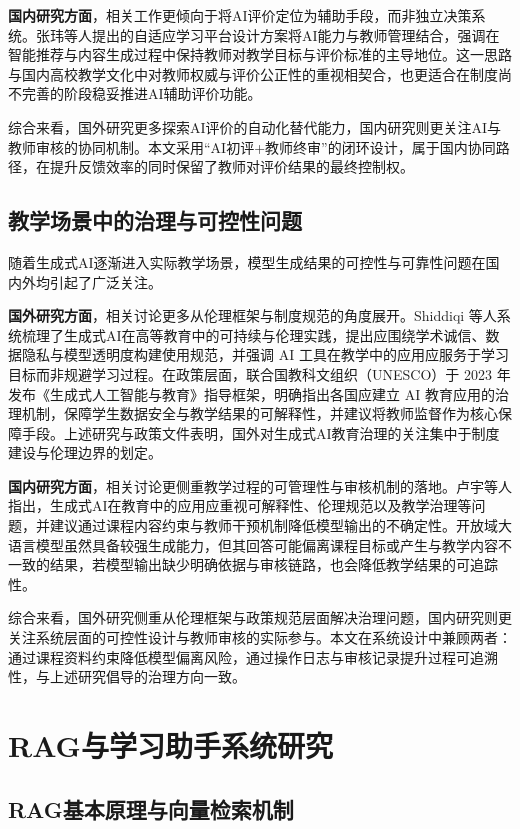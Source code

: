 \documentclass[12pt,a4paper,oneside]{ctexbook}
\numberwithin{equation}{chapter}
\begin{document}
\textbf{国内研究方面}，相关工作更倾向于将AI评价定位为辅助手段，而非独立决策系统。张玮等人提出的自适应学习平台设计方案将AI能力与教师管理结合，强调在智能推荐与内容生成过程中保持教师对教学目标与评价标准的主导地位\cite{ref4}。这一思路与国内高校教学文化中对教师权威与评价公正性的重视相契合，也更适合在制度尚不完善的阶段稳妥推进AI辅助评价功能。

综合来看，国外研究更多探索AI评价的自动化替代能力，国内研究则更关注AI与教师审核的协同机制。本文采用“AI初评+教师终审”的闭环设计，属于国内协同路径，在提升反馈效率的同时保留了教师对评价结果的最终控制权。

\subsection{教学场景中的治理与可控性问题}

随着生成式AI逐渐进入实际教学场景，模型生成结果的可控性与可靠性问题在国内外均引起了广泛关注。

\textbf{国外研究方面}，相关讨论更多从伦理框架与制度规范的角度展开。Shiddiqi 等人系统梳理了生成式AI在高等教育中的可持续与伦理实践，提出应围绕学术诚信、数据隐私与模型透明度构建使用规范，并强调 AI 工具在教学中的应用应服务于学习目标而非规避学习过程\cite{ref2}。在政策层面，联合国教科文组织（UNESCO）于 2023 年发布《生成式人工智能与教育》指导框架，明确指出各国应建立 AI 教育应用的治理机制，保障学生数据安全与教学结果的可解释性，并建议将教师监督作为核心保障手段\cite{ref16}。上述研究与政策文件表明，国外对生成式AI教育治理的关注集中于制度建设与伦理边界的划定。

\textbf{国内研究方面}，相关讨论更侧重教学过程的可管理性与审核机制的落地。卢宇等人指出，生成式AI在教育中的应用应重视可解释性、伦理规范以及教学治理等问题，并建议通过课程内容约束与教师干预机制降低模型输出的不确定性\cite{ref10}。开放域大语言模型虽然具备较强生成能力，但其回答可能偏离课程目标或产生与教学内容不一致的结果，若模型输出缺少明确依据与审核链路，也会降低教学结果的可追踪性。

综合来看，国外研究侧重从伦理框架与政策规范层面解决治理问题，国内研究则更关注系统层面的可控性设计与教师审核的实际参与。本文在系统设计中兼顾两者：通过课程资料约束降低模型偏离风险，通过操作日志与审核记录提升过程可追溯性，与上述研究倡导的治理方向一致。

\section{RAG与学习助手系统研究}

\subsection{RAG基本原理与向量检索机制}
\end{document}
